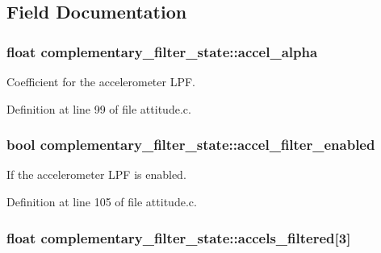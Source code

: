 \subsection{\-Field \-Documentation}
\hypertarget{structcomplementary__filter__state_a2a0dfc57428cafd19006fe7cd1dee0ce}{
\subsubsection[{accel\-\_\-alpha}]{\setlength{\rightskip}{0pt plus 5cm}float {\bf complementary\-\_\-filter\-\_\-state\-::accel\-\_\-alpha}}}\label{structcomplementary__filter__state_a2a0dfc57428cafd19006fe7cd1dee0ce}


\-Coefficient for the accelerometer \-L\-P\-F. 



\-Definition at line 99 of file attitude.\-c.

\hypertarget{structcomplementary__filter__state_a7d259f4954fc2a3ed14353faa41f6414}{
\subsubsection[{accel\-\_\-filter\-\_\-enabled}]{\setlength{\rightskip}{0pt plus 5cm}bool {\bf complementary\-\_\-filter\-\_\-state\-::accel\-\_\-filter\-\_\-enabled}}}\label{structcomplementary__filter__state_a7d259f4954fc2a3ed14353faa41f6414}


\-If the accelerometer \-L\-P\-F is enabled. 



\-Definition at line 105 of file attitude.\-c.

\hypertarget{structcomplementary__filter__state_a88a370dd8e3f412f189e5a585b9d1a52}{
\subsubsection[{accels\-\_\-filtered}]{\setlength{\rightskip}{0pt plus 5cm}float {\bf complementary\-\_\-filter\-\_\-state\-::accels\-\_\-filtered}\mbox{[}3\mbox{]}}}\label{structcomplementary__filter__state_a88a370dd8e3f412f189e5a585b9d1a52}


